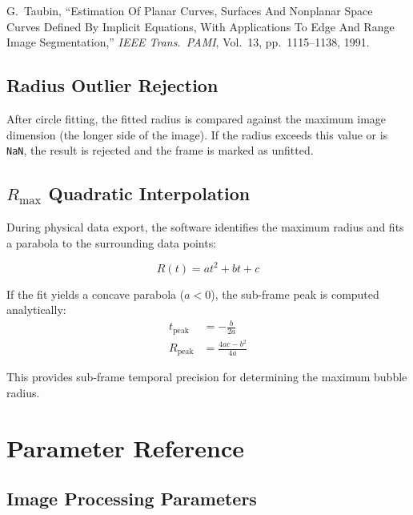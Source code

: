 \documentclass[11pt, letterpaper]{article}
\begin{document}
\begin{tipbox}[Reference]
    G.\ Taubin, ``Estimation Of Planar Curves, Surfaces And Nonplanar Space
    Curves Defined By Implicit Equations, With Applications To Edge And Range
    Image Segmentation,'' \emph{IEEE Trans.\ PAMI}, Vol.~13, pp.~1115--1138,
    1991.
\end{tipbox}

\subsection{Radius Outlier Rejection}

After circle fitting, the fitted radius is compared against the maximum image
dimension (the longer side of the image). If the radius exceeds this value or
is \texttt{NaN}, the result is rejected and the frame is marked as unfitted.

\subsection{$R_{\max}$ Quadratic Interpolation}

During physical data export, the software identifies the maximum radius and
fits a parabola to the surrounding data points:

\begin{equation}
    R(t) = at^2 + bt + c
\end{equation}

If the fit yields a concave parabola ($a < 0$), the sub-frame peak is
computed analytically:
\begin{align}
    t_{\text{peak}} &= -\frac{b}{2a} \\
    R_{\text{peak}} &= \frac{4ac - b^2}{4a}
\end{align}

This provides sub-frame temporal precision for determining the maximum bubble
radius.


\section{Parameter Reference}

\subsection{Image Processing Parameters}
\end{document}
